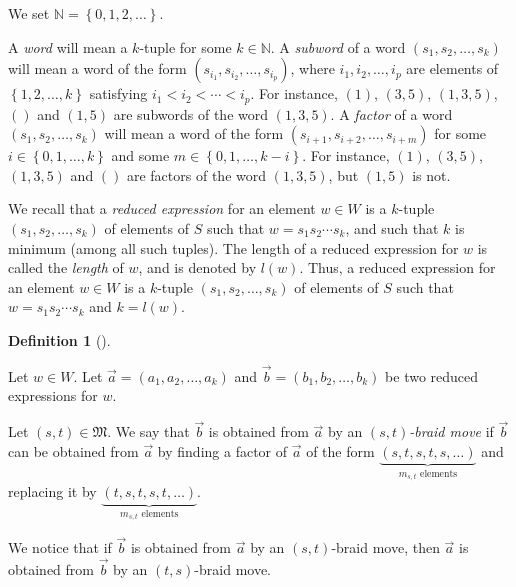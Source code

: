 \documentclass[numbers=enddot,12pt,final,onecolumn,notitlepage,abstracton]{scrartcl}%
\theoremstyle{definition}
\newtheorem{defi}[theo]{Definition}
\newenvironment{definition}[1][]
{\begin{defi}[#1]\begin{leftbar}}
{\end{leftbar}\end{defi}}
\begin{document}
We set $\mathbb{N}=\left\{  0,1,2,\ldots\right\}  $.

A \emph{word} will mean a $k$-tuple for some $k\in\mathbb{N}$. A
\emph{subword} of a word $\left(  s_{1},s_{2},\ldots,s_{k}\right)  $ will mean
a word of the form $\left(  s_{i_{1}},s_{i_{2}},\ldots,s_{i_{p}}\right)  $,
where $i_{1},i_{2},\ldots,i_{p}$ are elements of $\left\{  1,2,\ldots
,k\right\}  $ satisfying $i_{1}<i_{2}<\cdots<i_{p}$. For instance, $\left(
1\right)  $, $\left(  3,5\right)  $, $\left(  1,3,5\right)  $, $\left(
{}\right)  $ and $\left(  1,5\right)  $ are subwords of the word $\left(
1,3,5\right)  $. A \emph{factor} of a word $\left(  s_{1},s_{2},\ldots
,s_{k}\right)  $ will mean a word of the form $\left(  s_{i+1},s_{i+2}%
,\ldots,s_{i+m}\right)  $ for some $i\in\left\{  0,1,\ldots,k\right\}  $ and
some $m\in\left\{  0,1,\ldots,k-i\right\}  $. For instance, $\left(  1\right)
$, $\left(  3,5\right)  $, $\left(  1,3,5\right)  $ and $\left(  {}\right)  $
are factors of the word $\left(  1,3,5\right)  $, but $\left(  1,5\right)  $
is not.

We recall that a \emph{reduced expression} for an element $w\in W$ is a
$k$-tuple $\left(  s_{1},s_{2},\ldots,s_{k}\right)  $ of elements of $S$ such
that $w=s_{1}s_{2}\cdots s_{k}$, and such that $k$ is minimum (among all such
tuples). The length of a reduced expression for $w$ is called the
\emph{length} of $w$, and is denoted by $l\left(  w\right)  $. Thus, a reduced
expression for an element $w\in W$ is a $k$-tuple $\left(  s_{1},s_{2}%
,\ldots,s_{k}\right)  $ of elements of $S$ such that $w=s_{1}s_{2}\cdots
s_{k}$ and $k=l\left(  w\right)  $.

\begin{definition}
\label{def.braid}Let $w\in W$. Let $\overrightarrow{a}=\left(  a_{1}%
,a_{2},\ldots,a_{k}\right)  $ and $\overrightarrow{b}=\left(  b_{1}%
,b_{2},\ldots,b_{k}\right)  $ be two reduced expressions for $w$.

Let $\left(  s,t\right)  \in\mathfrak{M}$. We say that $\overrightarrow{b}$ is
obtained from $\overrightarrow{a}$ by an $\left(  s,t\right)  $\emph{-braid
move} if $\overrightarrow{b}$ can be obtained from $\overrightarrow{a}$ by
finding a factor of $\overrightarrow{a}$ of the form $\underbrace{\left(
s,t,s,t,s,\ldots\right)  }_{m_{s,t}\text{ elements}}$ and replacing it by
$\underbrace{\left(  t,s,t,s,t,\ldots\right)  }_{m_{s,t}\text{ elements}}$.

We notice that if $\overrightarrow{b}$ is obtained from $\overrightarrow{a}$
by an $\left(  s,t\right)  $-braid move, then $\overrightarrow{a}$ is obtained
from $\overrightarrow{b}$ by an $\left(  t,s\right)  $-braid move.
\end{definition}
\end{document}
